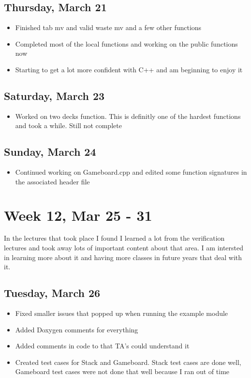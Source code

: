 \documentclass{article}
\begin{document}
\subsection{Thursday, March 21}
\begin{itemize}
    \item Finished tab mv and valid waste mv and a few other functions
    \item Completed most of the local functions and working on the public functions now
    \item Starting to get a lot more confident with C++ and am beginning to enjoy it
\end{itemize}

\subsection{Saturday, March 23}
\begin{itemize}
    \item Worked on two decks function. This is definitly one of the hardest functions and took a while. Still not complete
\end{itemize}

\subsection{Sunday, March 24}
\begin{itemize}
    \item Continued working on Gameboard.cpp and edited some function signatures in the associated header file
\end{itemize}

\section{Week 12, Mar 25 - 31}

In the lectures that took place I found I learned a lot from the verification lectures and took away lots of important content about that area. I am intersted in learning more about it and having more classes in future years that deal with it.

\subsection{Tuesday, March 26}
\begin{itemize}
    \item Fixed smaller issues that popped up when running the example module
    \item Added Doxygen comments for everything
    \item Added comments in code to that TA's could understand it
    \item Created test cases for Stack and Gameboard. Stack test cases are done well, Gameboard test cases were not done that well because I ran out of time
\end{itemize}
\end{document}
